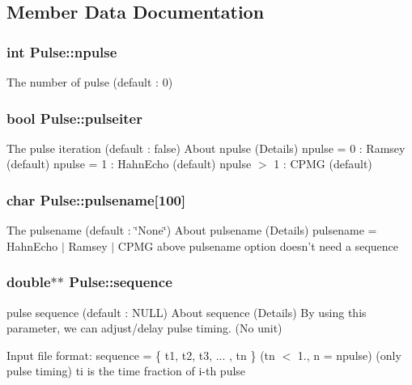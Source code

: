 \subsection{Member Data Documentation}
\hypertarget{structPulse_ab083ce764799722049dac44ad7479bad}{
\subsubsection[{npulse}]{\setlength{\rightskip}{0pt plus 5cm}int Pulse\-::npulse}}\label{structPulse_ab083ce764799722049dac44ad7479bad}
The number of pulse (default \-: 0) \hypertarget{structPulse_a4fcad551982a417a36f160cd0a6f0975}{
\subsubsection[{pulseiter}]{\setlength{\rightskip}{0pt plus 5cm}bool Pulse\-::pulseiter}}\label{structPulse_a4fcad551982a417a36f160cd0a6f0975}
The pulse iteration (default \-: false) About npulse (Details) npulse = 0 \-: Ramsey (default) npulse = 1 \-: Hahn\-Echo (default) npulse $>$ 1 \-: C\-P\-M\-G (default) \hypertarget{structPulse_a94ae332f008b81e37d8df344a3c7d9b7}{
\subsubsection[{pulsename}]{\setlength{\rightskip}{0pt plus 5cm}char Pulse\-::pulsename\mbox{[}100\mbox{]}}}\label{structPulse_a94ae332f008b81e37d8df344a3c7d9b7}
The pulsename (default \-: \char`\"{}\-None\char`\"{}) About pulsename (Details) pulsename = Hahn\-Echo $|$ Ramsey $|$ C\-P\-M\-G above pulsename option doesn't need a sequence \hypertarget{structPulse_af1bd05f903769ac217b18fb0c2ebc31a}{
\subsubsection[{sequence}]{\setlength{\rightskip}{0pt plus 5cm}double$\ast$$\ast$ Pulse\-::sequence}}\label{structPulse_af1bd05f903769ac217b18fb0c2ebc31a}
pulse sequence (default \-: N\-U\-L\-L) About sequence (Details) By using this parameter, we can adjust/delay pulse timing. (No unit)

Input file format\-: sequence = \{ t1, t2, t3, ... , tn \} (tn $<$ 1., n = npulse) (only pulse timing) ti is the time fraction of i-\/th pulse

